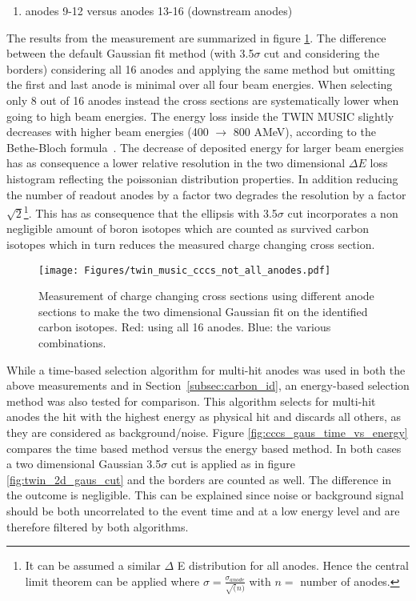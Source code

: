 \begin{appendices}
\begin{enumerate}[label=\alph*)]
\item anodes 9-12 versus anodes 13-16 (downstream anodes)
\end{enumerate}
The results from the measurement are summarized in figure \ref{fig:cccs_gaus_diff_sections}. The difference between the default Gaussian fit method (with 3.5$\sigma$ cut and considering the borders) considering all 16 anodes and applying the same method but omitting the first and last anode is minimal over all four beam energies. When selecting only 8 out of 16 anodes instead the cross sections are systematically lower when going to high beam energies. The energy loss inside the TWIN MUSIC slightly decreases with higher beam energies (400 $\rightarrow$ 800 AMeV), according to the Bethe-Bloch formula~\cite{bethe1930theorie}. The decrease of deposited energy for larger beam energies has as consequence a lower relative resolution in the two dimensional $\Delta E$ loss histogram reflecting the poissonian distribution properties. In addition reducing the number of readout anodes by a factor two degrades the resolution by a factor $\sqrt{2}$\footnote{It can be assumed a similar $\Delta$ E distribution for all anodes. Hence the central limit theorem can be applied where $\sigma = \frac{\sigma_{anode}}{\sqrt(n)}$ with $n =$ number of anodes.}. This has as consequence that the ellipsis with 3.5$\sigma$ cut incorporates a non negligible amount of boron isotopes which are counted as survived carbon isotopes which in turn reduces the measured charge changing cross section.
\newline
\newline
\newline
\begin{figure}[htpb]
    \centering
    \texttt{[image: Figures/twin\_music\_cccs\_not\_all\_anodes.pdf]}
    \caption{
   	Measurement of charge changing cross sections using different anode sections to make the two dimensional Gaussian fit on the identified carbon isotopes. Red: using all 16 anodes. Blue: the various combinations. 
     }
    \label{fig:cccs_gaus_diff_sections}
\end{figure}
While a time-based selection algorithm for multi-hit anodes was used in both the above measurements and in Section~\ref{subsec:carbon_id}, an energy-based selection method was also tested for comparison. This algorithm selects for multi-hit anodes the hit with the highest energy as physical hit and discards all others, as they are considered as background/noise. Figure \ref{fig:cccs_gaus_time_vs_energy} compares the time based method versus the energy based method. In both cases a two dimensional Gaussian 3.5$\sigma$ cut is applied as in figure \ref{fig:twin_2d_gaus_cut} and the borders are counted as well. The difference in the outcome is negligible. This can be explained since noise or background signal should be both uncorrelated to the event time and at a low energy level and are therefore filtered by both algorithms.

\end{appendices}
